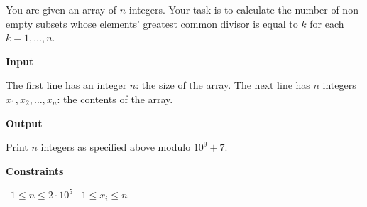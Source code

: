 You are given an array of $n$ integers. Your task is to calculate the number of non-empty subsets whose elements' greatest common divisor is equal to $k$ for each $k = 1,\dots, n$.

\vspace{0.3cm}\noindent\textbf{Input}

The first line has an integer $n$: the size of the array.
The next line has $n$ integers $x_1, x_2,\dots, x_n$: the contents of the array.

\vspace{0.3cm}\noindent\textbf{Output}

Print $n$ integers as specified above modulo $10^9 + 7$.

\vspace{0.3cm}\noindent\textbf{Constraints}

\textbullet\ $1 \le n \le 2 \cdot 10^5$
\textbullet\ $1 \le x_i \le n$
